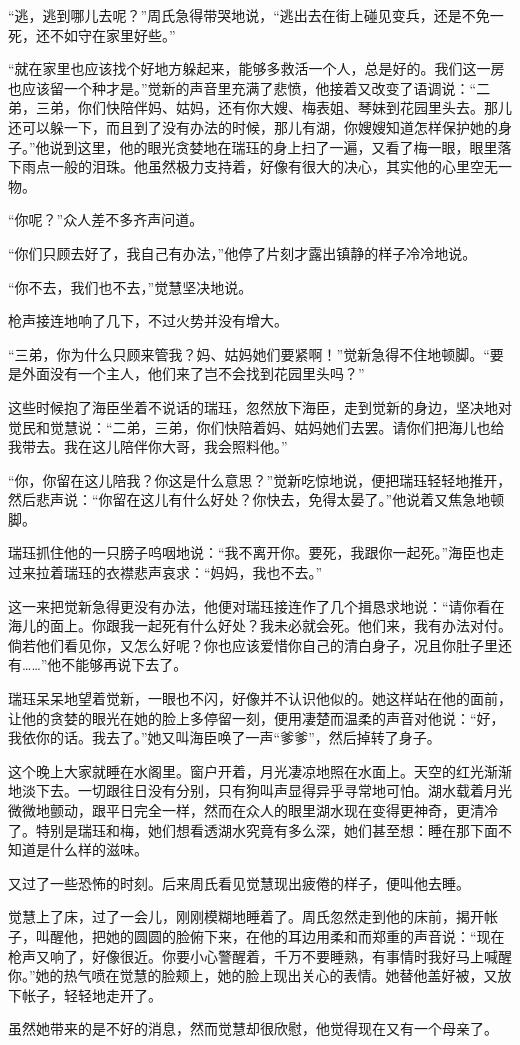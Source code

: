 \par “逃，逃到哪儿去呢？”周氏急得带哭地说，“逃出去在街上碰见变兵，还是不免一死，还不如守在家里好些。”
\par “就在家里也应该找个好地方躲起来，能够多救活一个人，总是好的。我们这一房也应该留一个种才是。”觉新的声音里充满了悲愤，他接着又改变了语调说：“二弟，三弟，你们快陪伴妈、姑妈，还有你大嫂、梅表姐、琴妹到花园里头去。那儿还可以躲一下，而且到了没有办法的时候，那儿有湖，你嫂嫂知道怎样保护她的身子。”他说到这里，他的眼光贪婪地在瑞珏的身上扫了一遍，又看了梅一眼，眼里落下雨点一般的泪珠。他虽然极力支持着，好像有很大的决心，其实他的心里空无一物。
\par “你呢？”众人差不多齐声问道。
\par “你们只顾去好了，我自己有办法，”他停了片刻才露出镇静的样子冷冷地说。
\par “你不去，我们也不去，”觉慧坚决地说。
\par 枪声接连地响了几下，不过火势并没有增大。
\par “三弟，你为什么只顾来管我？妈、姑妈她们要紧啊！”觉新急得不住地顿脚。“要是外面没有一个主人，他们来了岂不会找到花园里头吗？”
\par 这些时候抱了海臣坐着不说话的瑞珏，忽然放下海臣，走到觉新的身边，坚决地对觉民和觉慧说：“二弟，三弟，你们快陪着妈、姑妈她们去罢。请你们把海儿也给我带去。我在这儿陪伴你大哥，我会照料他。”
\par “你，你留在这儿陪我？你这是什么意思？”觉新吃惊地说，便把瑞珏轻轻地推开，然后悲声说：“你留在这儿有什么好处？你快去，免得太晏了。”他说着又焦急地顿脚。
\par 瑞珏抓住他的一只膀子呜咽地说：“我不离开你。要死，我跟你一起死。”海臣也走过来拉着瑞珏的衣襟悲声哀求：“妈妈，我也不去。”
\par 这一来把觉新急得更没有办法，他便对瑞珏接连作了几个揖恳求地说：“请你看在海儿的面上。你跟我一起死有什么好处？我未必就会死。他们来，我有办法对付。倘若他们看见你，又怎么好呢？你也应该爱惜你自己的清白身子，况且你肚子里还有……”他不能够再说下去了。
\par 瑞珏呆呆地望着觉新，一眼也不闪，好像并不认识他似的。她这样站在他的面前，让他的贪婪的眼光在她的脸上多停留一刻，便用凄楚而温柔的声音对他说：“好，我依你的话。我去了。”她又叫海臣唤了一声“爹爹”，然后掉转了身子。
\par 这个晚上大家就睡在水阁里。窗户开着，月光凄凉地照在水面上。天空的红光渐渐地淡下去。一切跟往日没有分别，只有狗叫声显得异乎寻常地可怕。湖水载着月光微微地颤动，跟平日完全一样，然而在众人的眼里湖水现在变得更神奇，更清冷了。特别是瑞珏和梅，她们想看透湖水究竟有多么深，她们甚至想：睡在那下面不知道是什么样的滋味。
\par 又过了一些恐怖的时刻。后来周氏看见觉慧现出疲倦的样子，便叫他去睡。
\par 觉慧上了床，过了一会儿，刚刚模糊地睡着了。周氏忽然走到他的床前，揭开帐子，叫醒他，把她的圆圆的脸俯下来，在他的耳边用柔和而郑重的声音说：“现在枪声又响了，好像很近。你要小心警醒着，千万不要睡熟，有事情时我好马上喊醒你。”她的热气喷在觉慧的脸颊上，她的脸上现出关心的表情。她替他盖好被，又放下帐子，轻轻地走开了。
\par 虽然她带来的是不好的消息，然而觉慧却很欣慰，他觉得现在又有一个母亲了。



